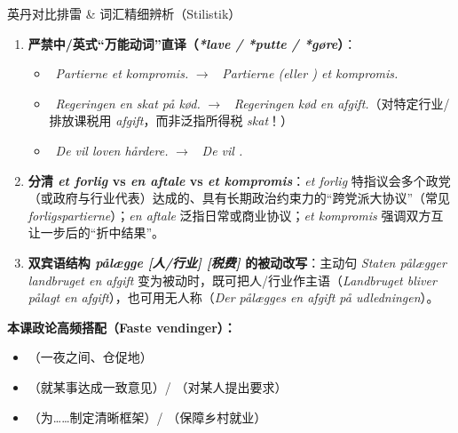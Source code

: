 \begin{grammatikbox}{英丹对比排雷 \& 词汇精细辨析（Stilistik）}
\begin{enumerate}
  \item \textbf{严禁中/英式“万能动词”直译（\textit{*lave / *putte / *gøre}）}：
    \begin{itemize}
      \item {}\ \textit{Partierne  et kompromis.} $\rightarrow$ \ \textit{Partierne  (eller ) et kompromis.}
      \item {}\ \textit{Regeringen  en skat på kød.} $\rightarrow$ \ \textit{Regeringen  kød en afgift.}（对特定行业/排放课税用 \textit{afgift}，而非泛指所得税 \textit{skat}！）
      \item {}\ \textit{De vil  loven hårdere.} $\rightarrow$ \ \textit{De vil .}
    \end{itemize}
  \item \textbf{分清 \textit{et forlig} vs \textit{en aftale} vs \textit{et kompromis}}：\textit{et forlig} 特指议会多个政党（或政府与行业代表）达成的、具有长期政治约束力的“跨党派大协议”（常见 \textit{forligspartierne}）；\textit{en aftale} 泛指日常或商业协议；\textit{et kompromis} 强调双方互让一步后的“折中结果”。
  \item \textbf{双宾语结构 \textit{pålægge [人/行业] [税费]} 的被动改写}：主动句 \textit{Staten pålægger landbruget en afgift} 变为被动时，既可把人/行业作主语（\textit{Landbruget bliver pålagt en afgift}），也可用无人称（\textit{Der pålægges en afgift på udledningen}）。
\end{enumerate}

\textbf{本课政论高频搭配（Faste vendinger）：}
\begin{itemize}
  \item {}（一夜之间、仓促地）
  \item {}（就某事达成一致意见）/ （对某人提出要求）
  \item {}（为……制定清晰框架）/ （保障乡村就业）
\end{itemize}
\end{grammatikbox}


